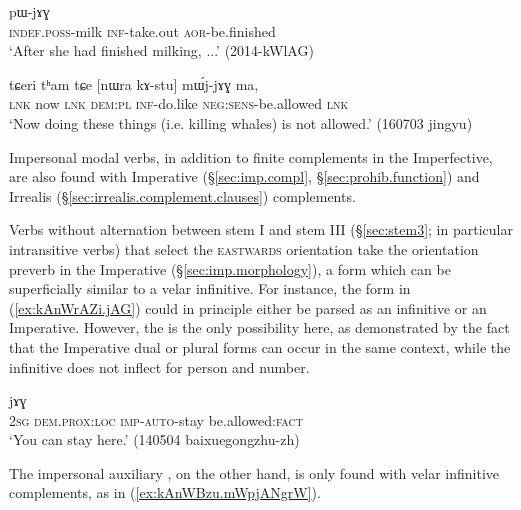 \begin{exe} 
\ex \label{ex:kAtCAt.pWjAG}
\gll [tɤ-lu kɤ-tɕɤt] pɯ-jɤɣ \\
\textsc{indef}.\textsc{poss}-milk \textsc{inf}-take.out \textsc{aor}-be.finished \\
\glt `After she had finished milking, ...' (2014-kWlAG)
\end{exe} 

\begin{exe} 
\ex \label{ex:kAstu.mWjjAG}
\gll tɕeri tʰam tɕe [nɯra kɤ-stu] mɯ́j-jɤɣ ma,  \\
\textsc{lnk} now \textsc{lnk} \textsc{dem}:\textsc{pl} \textsc{inf}-do.like \textsc{neg}:\textsc{sens}-be.allowed \textsc{lnk} \\
\glt `Now doing these things (i.e. killing whales) is not allowed.' (160703 jingyu)
\end{exe} 

Impersonal modal verbs, in addition to finite complements in the Imperfective, are also found with Imperative (§\ref{sec:imp.compl}, §\ref{sec:prohib.function}) and Irrealis (§\ref{sec:irrealis.complement.clauses}) complements. 


Verbs without alternation between stem I and stem III (§\ref{sec:stem3}; in particular intransitive verbs) that select the \textsc{eastwards} orientation take the  orientation preverb in the Imperative (§\ref{sec:imp.morphology}), a form which can be superficially similar to a velar infinitive. For instance, the form  in (\ref{ex:kAnWrAZi.jAG}) could in principle either be parsed as an infinitive or an Imperative. However, the is the only possibility here, as demonstrated by the fact that the Imperative dual  or plural  forms can occur in the same context, while the infinitive does not inflect for person and number.


\begin{exe} 
\ex \label{ex:kAnWrAZi.jAG}
 jɤɣ \\
\textsc{2sg} \textsc{dem}.\textsc{prox}:\textsc{loc} \textsc{imp}-\textsc{auto}-stay be.allowed:\textsc{fact} \\
\glt `You can stay here.' (140504 baixuegongzhu-zh)
\end{exe}

The impersonal auxiliary , on the other hand, is only found with velar infinitive complements, as in (\ref{ex:kAnWBzu.mWpjANgrW}).

